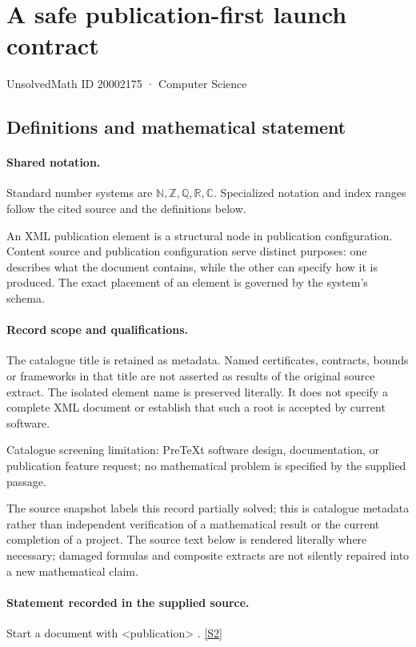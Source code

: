 \documentclass[11pt]{article}
\newcommand{\sref}[2]{\hyperlink{source:#1:#2}{[S#2]}}
\begin{document}
\setcounter{section}{20002174}
\section{A safe publication-first launch contract}\label{20002175}
{\small\sffamily UnsolvedMath ID 20002175 · Computer Science}
\subsection{Definitions and mathematical statement}

\paragraph{Shared notation.}Standard number systems are $\mathbb N,\mathbb Z,\mathbb Q,\mathbb R,\mathbb C$. Specialized notation and index ranges follow the cited source and the definitions below.


An XML publication element is a structural node in publication configuration. Content source and publication configuration serve distinct purposes: one describes what the document contains, while the other can specify how it is produced. The exact placement of an element is governed by the system's schema.
\paragraph{Record scope and qualifications.}
The catalogue title is retained as metadata. Named certificates, contracts, bounds or frameworks in that title are not asserted as results of the original source extract.
The isolated element name is preserved literally. It does not specify a complete XML document or establish that such a root is accepted by current software.

Catalogue screening limitation: PreTeXt software design, documentation, or publication feature request; no mathematical problem is specified by the supplied passage.

The source snapshot labels this record partially solved; this is catalogue metadata rather than independent verification of a mathematical result or the current completion of a project.
The source text below is rendered literally where necessary; damaged formulas and composite extracts are not silently repaired into a new mathematical claim.
\paragraph{Statement recorded in the supplied source.}
Start a document with <publication> . \sref{20002175}{2}
\end{document}
